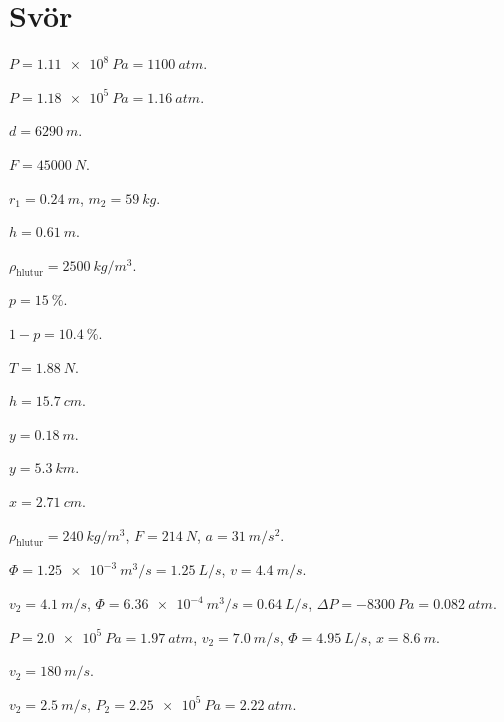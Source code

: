 \ifdefined \wholebook \else\documentclass[oneside]{book}\usepackage{EdlBook}\graphicspath{{figures/}}
\begin{document}
\newpage

\section*{Svör}

\begin{enumerate*}[label = \vspace{0.15cm} \textbf{(\arabic*)}]
  \item $P = \SI{1.11e8}{Pa} = \SI{1100}{atm}$. \item $P = \SI{1.18e5}{Pa} = \SI{1.16}{atm}$.
  \item $d = \SI{6290}{m}$.
  \item $F = \SI{45000}{N}$.
  \item $r_1 = \SI{0.24}{m}$, $m_2 = \SI{59}{kg}$.
  \item $h = \SI{0.61}{m}$.
  \item $\rho_{\text{hlutur}} = \SI{2500}{kg/m^3}$.
  \item $p = \SI{15}{\%}$.
  \item $1-p = \SI{10.4}{\%}$.
  \item $T = \SI{1.88}{N}$.
  \item $h = \SI{15.7}{cm}$.
  \item $y = \SI{0.18}{m}$.
  \item $y = \SI{5.3}{km}$.
  \item $x = \SI{2.71}{cm}$.
  \item $\rho_{\text{hlutur}} = \SI{240}{kg/m^3}$, $F = \SI{214}{N}$, $a = \SI{31}{m/s^2}$.
  \item $\Phi = \SI{1.25e-3}{m^3/s} = \SI{1.25}{L/s}$, $v = \SI{4.4}{m/s}$.
  \item $v_2 = \SI{4.1}{m/s}$, $\Phi = \SI{6.36e-4}{m^3/s} = \SI{0.64}{L/s}$, $\Delta P = \SI{-8300}{Pa} = \SI{0.082}{atm}$.
  \item $P = \SI{2.0e5}{Pa} = \SI{1.97}{atm}$, $v_2 = \SI{7.0}{m/s}$, $\Phi = \SI{4.95}{L/s}$, $x = \SI{8.6}{m}$.
  \item $v_2 = \SI{180}{m/s}$.
  \item $v_2 = \SI{2.5}{m/s}$, $P_2 = \SI{2.25e5}{Pa} = \SI{2.22}{atm}$.
\end{enumerate*}







\ifdefined \wholebook \else
 \printindex
\end{document}
